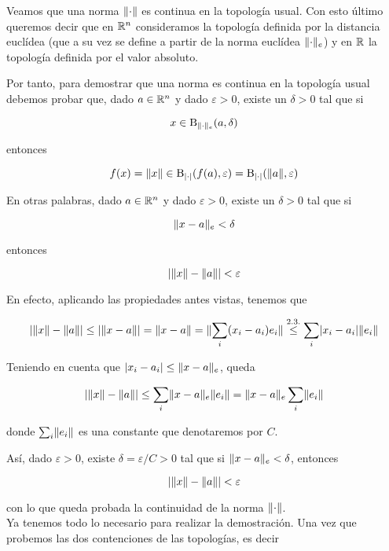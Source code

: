 Veamos que una norma $\lVert\cdot\rVert$ es continua en la topología usual. Con esto último queremos decir que en $\mathbb{R}^n$ consideramos la topología definida por la distancia euclídea (que a su vez se define a partir de la norma euclídea $\lVert\cdot\rVert_e$) y en $\mathbb{R}$ la topología definida por el valor absoluto.

Por tanto, para demostrar que una norma es continua en la topología usual debemos probar que, dado $a\in\mathbb{R}^n$ y dado $\varepsilon>0$, existe un $\delta>0$ tal que si 

\[x\in \operatorname{B}_{\lVert\cdot\rVert_e}(a,\delta)\]

entonces

\[f(x)=\lVert x\rVert\in \operatorname{B}_{\lvert\cdot\rvert}(f(a),\varepsilon)=\operatorname{B}_{\lvert\cdot\rvert}(\lVert a\rVert,\varepsilon)\]

En otras palabras, dado $a\in\mathbb{R}^n$ y dado $\varepsilon>0$, existe un $\delta>0$ tal que si

\[\lVert x-a\rVert_e<\delta\]

entonces

\[\lvert\lVert x\rVert-\lVert a\rVert\rvert<\varepsilon\]


En efecto, aplicando las propiedades antes vistas, tenemos que

\begin{equation*}
\lvert\lVert x\rVert-\lVert a\rVert\rvert\le \lvert\lVert x-a\rVert\rvert=\lVert x-a\rVert=\lVert\sum_i(x_i-a_i)e_i\rVert\stackrel{2.3.}{\le}\sum_i\lvert x_i-a_i\rvert\lVert e_i\rVert
\end{equation*}

Teniendo en cuenta que $\lvert x_i-a_i\rvert\le \lVert x-a\rVert_e$, queda

\begin{equation*}
\lvert\lVert x\rVert-\lVert a\rVert\rvert\le \sum_i\lVert x-a\rVert_e\lVert e_i\rVert=\lVert x-a\rVert_e\sum_i\lVert e_i\rVert
\end{equation*}

donde $\sum_i\lVert e_i\rVert$ es una constante que denotaremos por $C$.


Así, dado $\varepsilon>0$, existe $\delta=\varepsilon/C>0$ tal que si $\lVert x-a\rVert_e<\delta$, entonces

\begin{equation*}
\lvert\lVert x\rVert-\lVert a\rVert\rvert<\varepsilon
\end{equation*}

con lo que queda probada la continuidad de la norma $\lVert\cdot\rVert$.\\



Ya tenemos todo lo necesario para realizar la demostración. Una vez que probemos las dos contenciones de las topologías, es decir

